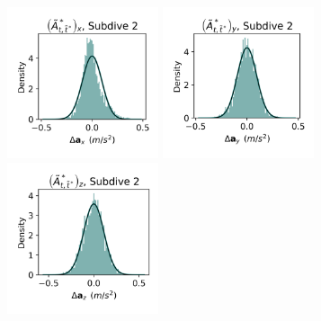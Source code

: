 \documentclass{article}
\begin{document}
\begin{center}
        \includegraphics[width=1.75in]{../Plots/2019/20190902-182840-CATs_OB_1_0_267_CarHMM_empirical_hist_Ax_1.png}
        \includegraphics[width=1.75in]{../Plots/2019/20190902-182840-CATs_OB_1_0_267_CarHMM_empirical_hist_Ay_1.png}
        \includegraphics[width=1.75in]{../Plots/2019/20190902-182840-CATs_OB_1_0_267_CarHMM_empirical_hist_Az_1.png}
        

\end{center}
\end{document}
